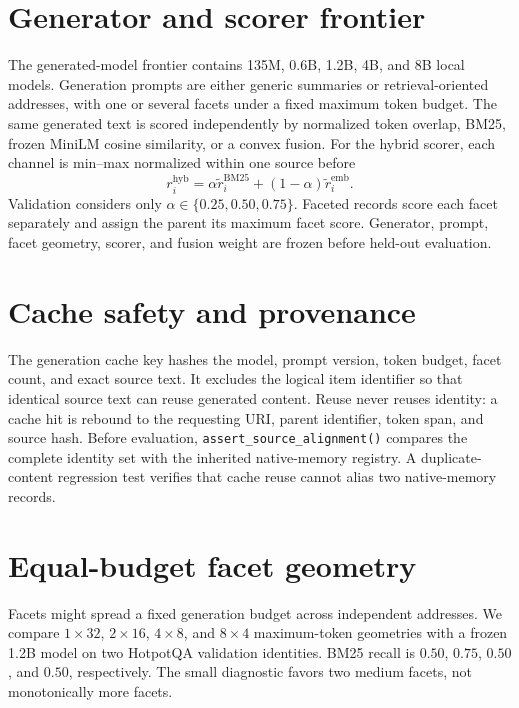 \documentclass[11pt]{article}
\newcommand{\code}[1]{\texttt{#1}}
\begin{document}
\appendix

\section{Generator and scorer frontier}
\label{app:frontier}

The generated-model frontier contains 135M, 0.6B, 1.2B, 4B, and 8B local
models. Generation prompts are either generic summaries or retrieval-oriented
addresses, with one or several facets under a fixed maximum token budget. The
same generated text is scored independently by normalized token overlap, BM25,
frozen MiniLM cosine similarity, or a convex fusion. For the hybrid scorer,
each channel is min--max normalized within one source before
\[
r_i^{\mathrm{hyb}}
=\alpha\widetilde r_i^{\mathrm{BM25}}
 +(1-\alpha)\widetilde r_i^{\mathrm{emb}}.
\]
Validation considers only $\alpha\in\{0.25,0.50,0.75\}$. Faceted records score
each facet separately and assign the parent its maximum facet score. Generator,
prompt, facet geometry, scorer, and fusion weight are frozen before held-out
evaluation.

\section{Cache safety and provenance}
\label{app:cache}

The generation cache key hashes the model, prompt version, token budget, facet
count, and exact source text. It excludes the logical item identifier so that
identical source text can reuse generated content. Reuse never reuses identity:
a cache hit is rebound to the requesting URI, parent identifier, token span,
and source hash. Before evaluation, \code{assert\_source\_alignment()} compares
the complete identity set with the inherited native-memory registry. A
duplicate-content regression test verifies that cache reuse cannot alias two
native-memory records.

\section{Equal-budget facet geometry}
\label{app:facets}

Facets might spread a fixed generation budget across independent addresses. We
compare $1\times32$, $2\times16$, $4\times8$, and $8\times4$ maximum-token
geometries with a frozen 1.2B model on two HotpotQA validation identities. BM25
recall is $0.50$, $0.75$, $0.50$, and $0.50$, respectively. The small
diagnostic favors two medium facets, not monotonically more facets.
\end{document}
